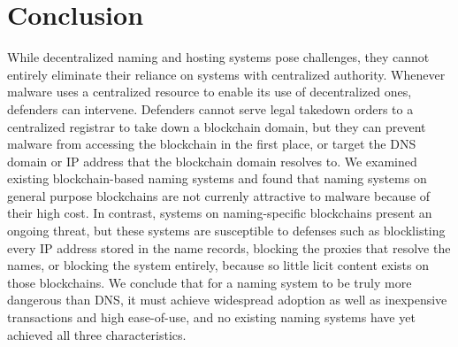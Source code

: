 \section{Conclusion}
\label{sec:conclusion}

While decentralized naming and hosting systems pose challenges, they cannot 
entirely 
eliminate their reliance on systems with centralized authority. Whenever 
malware uses a centralized 
resource to enable its use of decentralized ones, defenders can intervene. 
Defenders cannot serve 
legal takedown orders to a centralized registrar to take 
down a blockchain domain, but they can prevent malware from accessing the 
blockchain in the first 
place, or target the DNS domain or IP address that the blockchain domain 
resolves to. We examined existing blockchain-based naming systems and found 
that naming systems on general purpose blockchains are not 
currenly attractive to malware because of their high cost. In 
contrast, systems on naming-specific blockchains present an 
ongoing threat, but these systems are susceptible 
to defenses such as 
blocklisting every IP address stored in the name records, 
blocking the proxies that resolve the names, or blocking 
the system entirely, because so little licit 
content exists on those blockchains. We conclude that for a naming system to be 
truly more dangerous than DNS, it must achieve widespread 
adoption as well as inexpensive transactions and high 
ease-of-use, and no existing naming systems have yet achieved 
all three characteristics. 